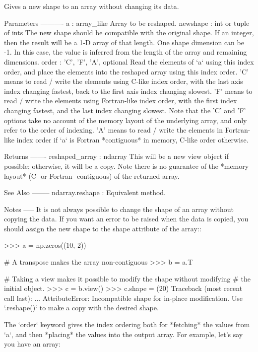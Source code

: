 \begin{DoxyVerb}Gives a new shape to an array without changing its data.

Parameters
----------
a : array_like
    Array to be reshaped.
newshape : int or tuple of ints
    The new shape should be compatible with the original shape. If
    an integer, then the result will be a 1-D array of that length.
    One shape dimension can be -1. In this case, the value is
    inferred from the length of the array and remaining dimensions.
order : {'C', 'F', 'A'}, optional
    Read the elements of `a` using this index order, and place the
    elements into the reshaped array using this index order.  'C'
    means to read / write the elements using C-like index order,
    with the last axis index changing fastest, back to the first
    axis index changing slowest. 'F' means to read / write the
    elements using Fortran-like index order, with the first index
    changing fastest, and the last index changing slowest. Note that
    the 'C' and 'F' options take no account of the memory layout of
    the underlying array, and only refer to the order of indexing.
    'A' means to read / write the elements in Fortran-like index
    order if `a` is Fortran *contiguous* in memory, C-like order
    otherwise.

Returns
-------
reshaped_array : ndarray
    This will be a new view object if possible; otherwise, it will
    be a copy.  Note there is no guarantee of the *memory layout* (C- or
    Fortran- contiguous) of the returned array.

See Also
--------
ndarray.reshape : Equivalent method.

Notes
-----
It is not always possible to change the shape of an array without
copying the data. If you want an error to be raised when the data is copied,
you should assign the new shape to the shape attribute of the array::

 >>> a = np.zeros((10, 2))

 # A transpose makes the array non-contiguous
 >>> b = a.T

 # Taking a view makes it possible to modify the shape without modifying
 # the initial object.
 >>> c = b.view()
 >>> c.shape = (20)
 Traceback (most recent call last):
    ...
 AttributeError: Incompatible shape for in-place modification. Use
 `.reshape()` to make a copy with the desired shape.

The `order` keyword gives the index ordering both for *fetching* the values
from `a`, and then *placing* the values into the output array.
For example, let's say you have an array:


\end{DoxyVerb}
